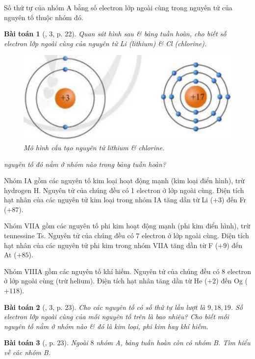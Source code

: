 \documentclass{article}
\newtheorem{baitoan}{Bài toán}
\begin{document}
Số thứ tự của nhóm A bằng số electron lớp ngoài cùng trong nguyên tử của nguyên tố thuộc nhóm đó.

\begin{baitoan}[\cite{SGK_KHTN_7_Canh_Dieu}, 3, p. 22]
	Quan sát hình sau \& bảng tuần hoàn, cho biết số electron lớp ngoài cùng của nguyên tử \emph{Li} (lithium) \& \emph{Cl} (chlorine).
	\begin{figure}[H]
		\centering
		\includegraphics[scale=0.3]{lithium_chlorine}
		\caption{Mô hình cấu tạo nguyên tử lithium \& chlorine.}
	\end{figure}
	 nguyên tố đó nằm ở nhóm nào trong bảng tuần hoàn?
\end{baitoan}
Nhóm IA gồm các nguyên tố kim loại hoạt động mạnh (kim loại điển hình), trừ hydrogen H. Nguyên tử của chúng đều có 1 electron ở lớp ngoài cùng. Điện tích hạt nhân của các nguyên tử kim loại trong nhóm IA tăng dần từ Li ($+3$) đến Fr ($+87$).

Nhóm VIIA gồm các nguyên tố phi kim hoạt động mạnh (phi kim điển hình), trừ tennessine Ts. Nguyên tử của chúng đều có 7 electron ở lớp ngoài cùng. Điện tích hạt nhân của các nguyên tử phi kim trong nhóm VIIA tăng dần từ F ($+9$) đến At ($+85$).

Nhóm VIIIA gồm các nguyên tố khí hiếm. Nguyên tử của chúng đều có 8 electron ở lớp ngoài cùng (trừ helium). Điện tích hạt nhân tăng dần từ He ($+2$) đến Og ($+118$).

\begin{baitoan}[\cite{SGK_KHTN_7_Canh_Dieu}, 3, p. 23]
	Cho các nguyên tố có số thứ tự lần lượt là $9,18,19$. Số electron lớp ngoài cùng của mỗi nguyên tố trên là bao nhiêu? Cho biết mỗi nguyên tố nằm ở nhóm nào \& đó là kim loại, phi kim hay khí hiếm.
\end{baitoan}

\begin{baitoan}[\cite{SGK_KHTN_7_Canh_Dieu}, p. 23]
	Ngoài $8$ nhóm A, bảng tuần hoàn còn có nhóm B. Tìm hiểu về các nhóm B.
\end{baitoan}
\end{document}
